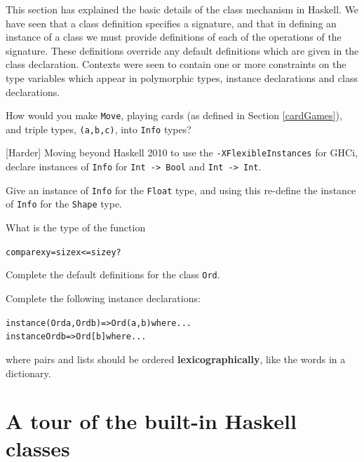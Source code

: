 


\begin{summary}
This section has explained the basic details of the class mechanism in
Haskell. We have seen that a class definition specifies a signature, and that
in defining an instance of a class we must provide definitions of each of the
operations of the signature.
These definitions override any default
definitions which are given in the class declaration. Contexts were seen to
contain one or more constraints on the type variables which appear in
polymorphic types, instance declarations and class declarations.
\end{summary}

\begin{exercises}



\item
How would you make \texttt{Move}, playing cards (as defined in Section \ref{cardGames}), and triple types,
\texttt{(a,b,c)}, into \texttt{Info} types?

\item {[Harder]}
Moving beyond Haskell 2010 to use the \texttt{-XFlexibleInstances} for GHCi, declare instances of \texttt{Info} for \texttt{Int -> Bool} and \texttt{Int -> Int}.

\item
Give an instance of \texttt{Info} for the \texttt{Float} type, and using this re-define the instance of \texttt{Info} for the \texttt{Shape} type.


\item
What is the type of the function
\begin{alltt}
compare x y    = size x <= size y ?
\end{alltt}

\item
Complete the default definitions for the class \texttt{Ord}.

\item
Complete the following instance declarations:
\begin{alltt}
instance (Ord a, Ord b) => Ord (a,b) where ...
instance Ord b => Ord [b] where ...
\end{alltt}
where pairs and lists should be ordered \textbf{lexicographically}, like the words in a
dictionary.
\end{exercises}



\section{A tour of the built-in Haskell classes}
\label{haskellClasses}

